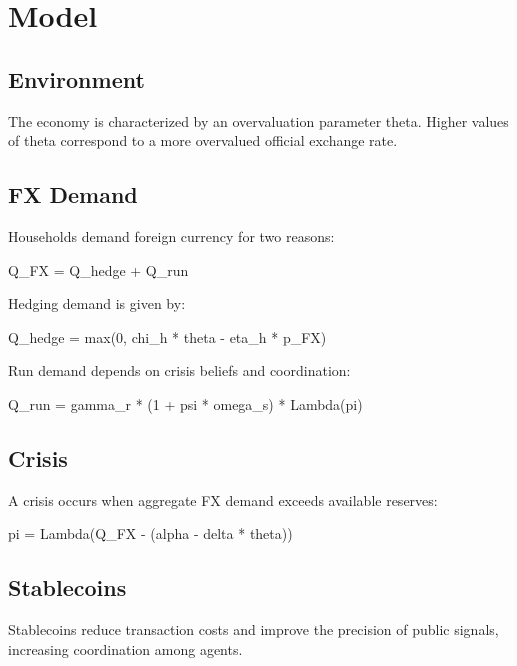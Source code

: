 \section{Model}

\subsection{Environment}

The economy is characterized by an overvaluation parameter theta. Higher values of theta correspond to a more overvalued official exchange rate.

\subsection{FX Demand}

Households demand foreign currency for two reasons:

Q_FX = Q_hedge + Q_run

Hedging demand is given by:

Q_hedge = max(0, chi_h * theta - eta_h * p_FX)

Run demand depends on crisis beliefs and coordination:

Q_run = gamma_r * (1 + psi * omega_s) * Lambda(pi)

\subsection{Crisis}

A crisis occurs when aggregate FX demand exceeds available reserves:

pi = Lambda(Q_FX - (alpha - delta * theta))

\subsection{Stablecoins}

Stablecoins reduce transaction costs and improve the precision of public signals, increasing coordination among agents.
